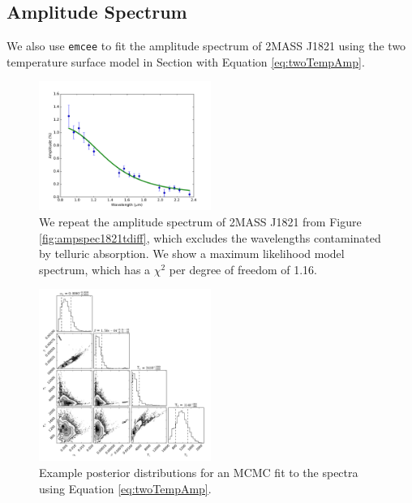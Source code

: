 \documentclass[manuscript]{aastex6}
\begin{document}
\clearpage
\pagebreak
\subsection{Amplitude Spectrum}

We also use \texttt{emcee} to fit the amplitude spectrum of 2MASS J1821 using the two temperature surface model in Section \label{sec:spotModel} with Equation \ref{eq:twoTempAmp}.

\begin{figure}
\begin{centering}
\includegraphics[width=0.5\textwidth]{best_fit_spec_2temp.pdf}
\caption{We repeat the amplitude spectrum of 2MASS J1821 from Figure \ref{fig:ampspec1821tdiff}, which excludes the wavelengths contaminated by telluric absorption.
We show a maximum likelihood model spectrum, which has a $\chi^2$ per degree of freedom of 1.16.}\label{fig:ML2Tempfit}
\end{centering}
\end{figure}

\begin{figure}
\begin{centering}
\includegraphics[width=0.5\textwidth]{corner_fit_2temp.pdf}
\caption{Example posterior distributions for an MCMC fit to the spectra using Equation \ref{eq:twoTempAmp}.}\label{fig:post2Tempfit}
\end{centering}
\end{figure}
\end{document}

